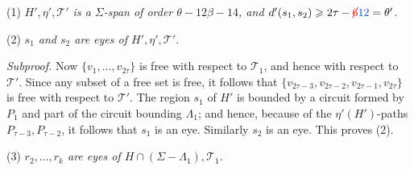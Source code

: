\hspace*{12pt}(1) \textit{$H', \eta', \mathscr{T}'$ is a $\Sigma$-span of order $\theta - 12\beta - 14$, and $d'(s_1, s_2) \ge 2\tau - \delm{6}\fix{12} = \theta'$.}

\hspace*{12pt}(2) \textit{$s_1$ and $s_2$ are eyes of $H', \eta', \mathscr{T}'$.}

\textit{Subproof.} Now $\{v_1, \dots, v_{2\tau}\}$ is free with respect to $\mathscr{T}_1$, and hence with respect to $\mathscr{T}'$. Since any subset of a free set is free, it follows that $\{v_{2\tau - 3}, v_{2\tau - 2}, v_{2\tau - 1}, v_{2\tau}\}$ is free with respect to $\mathscr{T}'$. The region $s_1$ of $H'$ is bounded by a circuit formed by $P_1$ and part of the circuit bounding $\Lambda_1$; and hence, because of the $\eta'(H')$-paths $P_{\tau - 3}, P_{\tau - 2}$, it follows that $s_1$ is an eye. Similarly $s_2$ is an eye. This proves (2).

\hspace*{12pt}(3) \textit{$r_2, \dots, r_k$ are eyes of $H \cap (\Sigma - \Lambda_1), \mathscr{T}_1$.}

